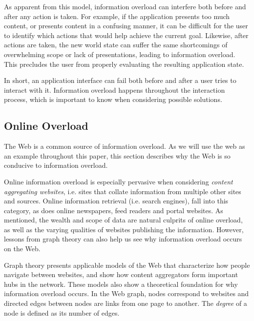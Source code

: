 As apparent from this model, information overload can interfere both before and after any action is taken. 
For example, if the application presents too much content, or presents content in a confusing manner, 
it can be difficult for the user to identify which actions that would help achieve the current goal. 
Likewise, after actions are taken, the new world state can suffer the same shortcomings of overwhelming scope or lack of presentations, 
leading to information overload. 
This precludes the user from properly evaluating the resulting application state. 

In short, an application interface can fail both before and after a user tries to interact with it.
Information overload happens throughout the interaction process, which is important to know when considering possible solutions.

\subsection{Online Overload}

The Web is a common source of information overload. 
As we will use the web as an example throughout this paper, 
this section describes why the Web is so conducive to information overload.

Online information overload is especially pervasive when considering \emph{content aggregating websites}, 
i.e. sites that collate information from multiple other sites and sources. 
Online information retrieval (i.e. search engines), fall into this category, as does
online newspapers, feed readers and portal websites.
As mentioned, the wealth and scope of data are natural culprits of online overload, 
as well as the varying qualities of websites publishing the information. 
However, lessons from graph theory can also help us see why information overload occurs on the Web.

Graph theory presents applicable models of the Web that characterize how people navigate between websites, 
and show how content aggregators form important hubs in the network. 
These models also show a theoretical foundation for why information overload occurs.
In the Web graph, nodes correspond to websites and
directed edges between nodes are links from one page to another. The \emph{degree} of a node is defined as its number of edges.

